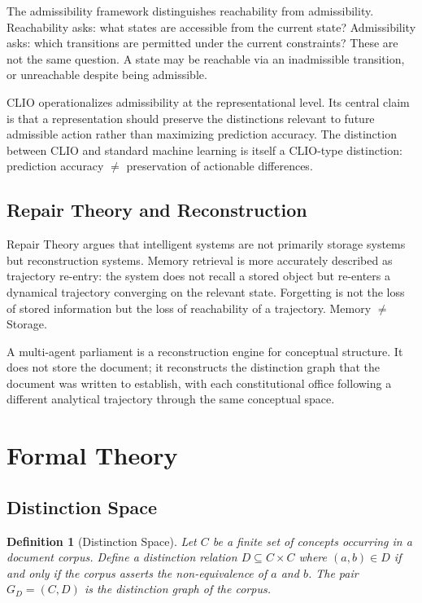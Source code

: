 \documentclass[12pt, a4paper]{article}
\newtheorem{definition}{Definition}[section]
\theoremstyle{principle}
\theoremstyle{definition}
\begin{document}
The admissibility framework distinguishes reachability from admissibility.
Reachability asks: what states are accessible from the current state? Admissibility
asks: which transitions are permitted under the current constraints? These are not the
same question. A state may be reachable via an inadmissible transition, or
unreachable despite being admissible.

CLIO operationalizes admissibility at the representational level. Its central claim
is that a representation should preserve the distinctions relevant to future
admissible action rather than maximizing prediction accuracy. The distinction between
CLIO and standard machine learning is itself a CLIO-type distinction: prediction
accuracy $\neq$ preservation of actionable differences.

\subsection{Repair Theory and Reconstruction}

Repair Theory argues that intelligent systems are not primarily storage systems but
reconstruction systems. Memory retrieval is more accurately described as trajectory
re-entry: the system does not recall a stored object but re-enters a dynamical
trajectory converging on the relevant state. Forgetting is not the loss of stored
information but the loss of reachability of a trajectory. Memory $\neq$ Storage.

A multi-agent parliament is a reconstruction engine for conceptual structure. It does
not store the document; it reconstructs the distinction graph that the document was
written to establish, with each constitutional office following a different analytical
trajectory through the same conceptual space.

\section{Formal Theory}
\label{sec:formal}

\subsection{Distinction Space}

\begin{definition}[Distinction Space]
Let $C$ be a finite set of concepts occurring in a document corpus. Define a
\emph{distinction relation} $D \subseteq C \times C$ where $(a, b) \in D$ if and
only if the corpus asserts the non-equivalence of $a$ and $b$. The pair
$G_D = (C, D)$ is the \emph{distinction graph} of the corpus.
\end{definition}
\end{document}
